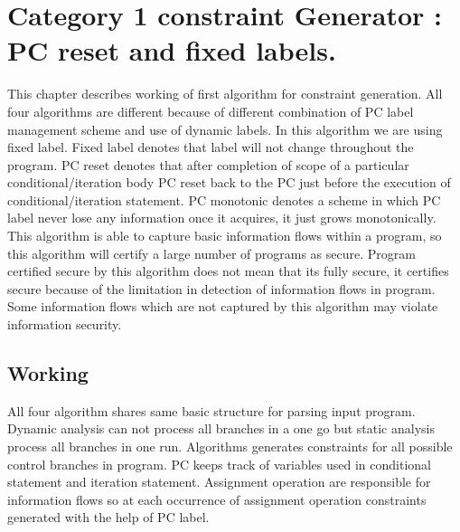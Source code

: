 \chapter{ Category 1 constraint Generator : PC reset and fixed labels.}
\label{ch:c1}
This chapter describes working of first algorithm for constraint generation. All four algorithms are different because of different combination of PC label management scheme and  use of dynamic labels. In this algorithm we are using fixed label. Fixed label denotes that label will not change throughout the program. PC reset denotes that after completion of scope of a particular conditional/iteration body PC reset back to the PC just before the execution of conditional/iteration statement. PC monotonic denotes a scheme in which PC label never lose any information once it acquires, it just grows monotonically. This algorithm is able to capture basic information flows within a program, so this algorithm will certify a large number of programs as secure. Program certified secure by this algorithm does not mean that its fully secure, it certifies secure because of the limitation in detection of information flows in program. Some information flows which are not captured by this algorithm may violate information security.\\
\section{Working}
All four algorithm shares same basic structure for parsing input program. Dynamic analysis can not process all branches in a one go but static analysis process all branches in one run. Algorithms generates constraints for all possible control branches in program.  PC keeps track of variables used in conditional statement and iteration statement. Assignment operation are responsible for information flows so at each occurrence of assignment operation constraints generated with the help of PC label.
